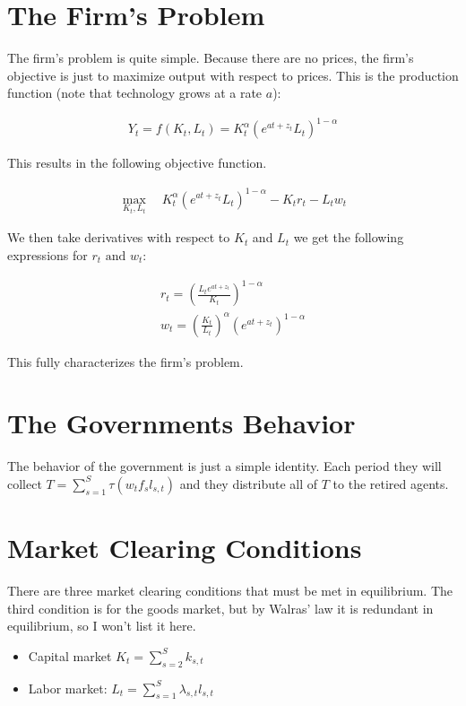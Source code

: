 \documentclass[paper=a4, fontsize=11pt]{scrartcl} %
\numberwithin{figure}{section} %
\numberwithin{table}{section} %
\begin{document}
\section{The Firm's Problem}

    The firm's problem is quite simple. Because there are no prices, the firm's objective is just to maximize output with respect to prices. This is the production function (note that technology grows at a rate $a$):

    \begin{align}
        Y_t = f(K_t, L_t) = K_t^{\alpha} (e^{at + z_t} L_t) ^{1 - \alpha}
     \end{align}

      This results in the following objective function.

    \begin{align}
        \max_{K_t, L_t} \quad K_t^{\alpha} (e^{at + z_t} L_t) ^{1 - \alpha} - K_t r_t - L_t w_t
    \end{align}

    We then take derivatives with respect to $K_t$ and $L_t$ we get the following expressions for $r_t \text{ and } w_t$:

    \begin{align}
        r_t = \left(\frac{L_t e^{at + z_t}}{K_t} \right)^{1 - \alpha} \\
        w_t = \left(\frac{K_t}{L_t} \right)^{\alpha} (e^{at + z_t})^{1 - \alpha}
    \end{align}

    This fully characterizes the firm's problem.

\section{The Governments Behavior}

The behavior of the government is just a simple identity. Each period they will collect $T = \sum_{s=1}^S \tau (w_t f_s l_{s,t})$ and they distribute all of $T$ to the retired agents.

\section{Market Clearing Conditions}
	There are three market clearing conditions that must be met in equilibrium. The third condition is for the goods market, but by Walras' law it is redundant in equilibrium, so I won't list it here.

	\begin{itemize}
		\item Capital market $K_t = \sum_{s=2}^S k_{s, t}$
		\item Labor market: $L_t = \sum_{s = 1} ^S \lambda_{s, t} l_{s, t}$
	\end{itemize}
\end{document}
